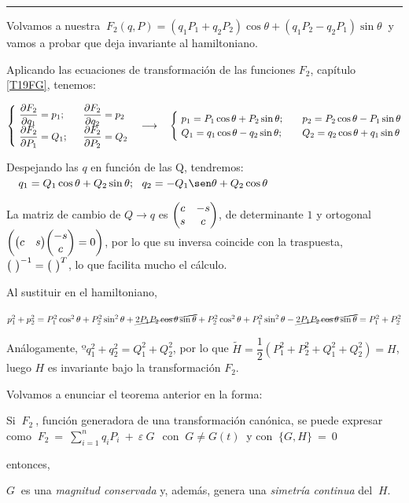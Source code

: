 \begin{center} \rule{250pt}{0.1pt} \end{center}

Volvamos a nuestra  $\ F_2(q,P)=(q_1P_1+q_2P_2)\cos \theta + (q_1P_2-q_2P_1)\sin \theta \ $ y vamos a probar que deja invariante al hamiltoniano.

Aplicando las ecuaciones de transformación de las funciones $F_2$, capítulo \ref{T19FG}, tenemos:


$\begin{cases} \ \displaystyle \pdv{F_2}{q_1} = p_1; &\ \ \displaystyle  \pdv{F_2}{q_2}=p_2 \\  \ \displaystyle \pdv{F_2}{P_1} = Q_1; &\ \ \displaystyle  \pdv{F_2}{P_2}=Q_2 \end{cases} \quad \longrightarrow \quad 
\begin{cases}
\ p_1=P_1\cos \theta + P_2 \sin \theta ; &\ \ \ 	p_2=P_2\cos \theta - P_1 \sin \theta \\ \ Q_1=q_1\cos \theta - q_2 \sin \theta ; &  \ \ \ Q_2=q_2\cos \theta + q_1 \sin \theta
\end{cases}$

Despejando las $q$ en función de las Q, tendremos: $\quad q_1=Q_1\cos \theta + Q_2 \sin \theta ;\ \ q_2=-Q_1\sen \theta + Q_2 \cos \theta$

\textcolor{gris} {La matriz de cambio de $Q\to q$ es  $\mqty(c&-s\\s&c)$, de determinante $1$ y ortogonal $\left( \mqty(c&s)\mqty(-s\\c)=0 \right)$, por lo que su inversa coincide con la traspuesta, $\mqty(\ )^{-1}=\mqty(\ )^T$, lo que facilita mucho el cálculo.}


Al sustituir en el hamiltoniano, 

$p_1^2+p_2^2=P_1^2 \cos^2 \theta + P_2^2 \sin^2 \theta + \cancel{2P_1P_2\cos \theta \sin \theta} + P_2^2 \cos^2 \theta + P_1^2 \sin^2 \theta -\cancel{2P_1P_2\cos \theta \sin \theta}=P_1^2+P_2^2$

Análogamente, $º q_1^2+q_2^2=Q_1^2+Q_2^2$, por lo que $\widetilde H=\dfrac 1 2 (P_1^2+P_2^2+Q_1^2+Q_2^2)=H$, luego $H$ es invariante bajo la transformación $F_2$.


\vspace{5mm} Volvamos a enunciar el teorema anterior en la forma: 

\begin{large}
\begin{theorem}

\vspace{2mm} Si $\ F_2\ $, función generadora de una transformación canónica, se puede expresar como $	\ \displaystyle F_2 \ = \ \sum_{i=1}^n q_iP_i \ + \ \varepsilon \ G \, \ $ con $\ G\neq G(t)\ $ y con $\ \{G,H\}\ = \ 0 \ $

\vspace{4mm} \hspace{2cm} entonces, 

\vspace{4mm} $G\ $ es una \emph{magnitud conservada} y, además, genera una \emph{simetría continua} del $\ H.$
\end{theorem}
\end{large}

